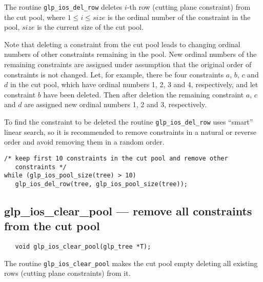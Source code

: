 \description

The routine \verb|glp_ios_del_row| deletes $i$-th row (cutting plane
constraint) from the cut pool, where $1\leq i\leq size$ is the ordinal
number of the constraint in the pool, $size$ is the current size of the
cut pool.

Note that deleting a constraint from the cut pool leads to changing
ordinal numbers of other constraints remaining in the pool. New ordinal
numbers of the remaining constraints are assigned under assumption that
the original order of constraints is not changed. Let, for example,
there be four constraints $a$, $b$, $c$ and $d$ in the cut pool, which
have ordinal numbers 1, 2, 3 and 4, respectively, and let constraint
$b$ have been deleted. Then after deletion the remaining constraint $a$,
$c$ and $d$ are assigned new ordinal numbers 1, 2 and 3, respectively.

To find the constraint to be deleted the routine \verb|glp_ios_del_row|
uses ``smart'' linear search, so it is recommended to remove
constraints in a natural or reverse order and avoid removing them in
a random order.


\begin{verbatim}
/* keep first 10 constraints in the cut pool and remove other
   constraints */
while (glp_ios_pool_size(tree) > 10)
   glp_ios_del_row(tree, glp_ios_pool_size(tree));
\end{verbatim}

\subsection{glp\_ios\_clear\_pool --- remove all constraints from the
cut pool}

\synopsis

\begin{verbatim}
   void glp_ios_clear_pool(glp_tree *T);
\end{verbatim}

\description

The routine \verb|glp_ios_clear_pool| makes the cut pool empty deleting
all existing rows (cutting plane constraints) from it.

